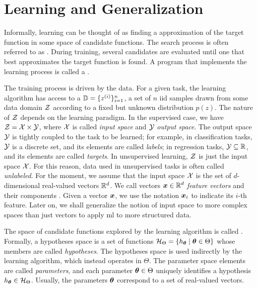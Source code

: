 \section{Learning and Generalization}\label{sec:learning}
Informally, learning can be thought of as finding a  approximation of the target function in some space of candidate functions. The search process is often referred to as . During training, several candidates are evaluated until one that best approximates the target function is found. A program that implements the learning process is called a .

The training process is driven by the data. For a given task, the learning algorithm has access to a  $\mathbb{D} = \{z^{(i)}\}_{i=1}^n$, a set of $n$ \gls{iid} samples drawn from some data domain $\Cal{Z}$ according to a fixed but unknown distribution $p(z)$. The nature of $\Cal{Z}$ depends on the learning paradigm. In the supervised case, we have $\Cal{Z} = \Cal{X} \times \Cal{Y}$, where $\Cal{X}$ is called \emph{input space} and $\Cal{Y}$ \emph{output space}. The output space $\Cal{Y}$ is tightly coupled to the task to be learned; for example, in classification tasks, $\Cal{Y}$ is a discrete set, and its elements are called \emph{labels}; in regression tasks, $\Cal{Y} \subseteq \Real$, and its elements are called \emph{targets}. In unsupervised learning, $\Cal{Z}$ is just the input space $\Cal{X}$. For this reason, data used in unsupervised tasks is often called \emph{unlabeled}. For the moment, we assume that the input space $\Cal{X}$ is the set of $d$-dimensional real-valued vectors $\mathbb{R}^d$. We call vectors $\Vector{x} \in \Real^d$  \emph{feature vectors} and their components . Given a vector $\Vector{x}$, we use the notation $\Feature{x}{i}$ to indicate its $i$-th feature. Later on, we shall generalize the notion of input space to more complex spaces than just vectors to apply \gls{ml} to more structured data.

The space of candidate functions explored by the learning algorithm is called . Formally, a hypotheses space is a set of functions $\HSpace = \Set{h_{\Param} \mid \Param \in \Theta}$ whose members are called \emph{hypotheses}. The hypotheses space is used indirectly by the learning algorithm, which instead operates in  $\Theta$. The parameter space elements are called \emph{parameters}, and each parameter $\boldsymbol{\theta} \in \Theta$ uniquely identifies a hypothesis $h_{\Param} \in \HSpace$. Usually, the parameters $\boldsymbol{\theta}$ correspond to a set of real-valued vectors.

